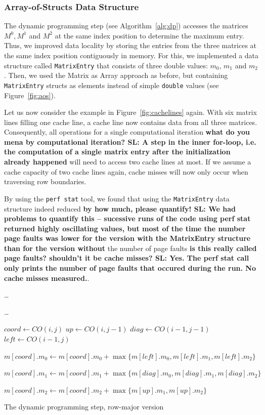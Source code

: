 \documentclass[runningheads,a4paper]{llncs}
\begin{document}
\subsubsection{Array-of-Structs Data Structure}
The dynamic programming step (see Algorithm~\ref{alg:dp}) accesses the matrices $M^0, M^1$ and $M^2$ at the same index position to determine the maximum entry. 
Thus, we improved data locality by storing the entries from the three matrices at the same index position contiguously in memory. 
For this, we implemented a data structure called \texttt{MatrixEntry} that consists of three double values: \texttt{$m_0$}, \texttt{$m_1$} and \texttt{$m_2$}. 
Then, we used the Matrix as Array approach as before, but containing \texttt{MatrixEntry} structs as elements instead of simple 
\texttt{double} values (see Figure~\ref{fig:aos}). 

Let us now consider the example in Figure~\ref{fig:cachelines} again. 
With six matrix lines filling one cache line, a cache line now contains data from all three matrices. 
Consequently, all operations for a single computational iteration {\bf what do you mena by computational iteration? SL: A step in the inner for-loop, i.e. the computation of a single matrix entry after the initialization already happened} 
will need to access two cache lines at most. 
If we assume a cache capacity of two cache lines again, cache misses will now only occur when traversing row boundaries.

By using the \texttt{perf stat} tool, we found that using the \texttt{MatrixEntry} data structure indeed reduced {\bf by how much, please quantify! SL: We had problems to quantify this -- sucessive runs of the code using perf stat returned highly oscillating values, but most of the time the number page faults was lower for the version with the MatrixEntry structure than for the version without}
the number of page faults {\bf is this really called page faults? shouldn't it be cache misses? SL: Yes. The perf stat call only prints the number of page faults that occured during the run. No cache misses measured.}.

\begin{algorithm}

\ldots{}
 {
	 {
		\ldots{}
		
		$coord \gets CO(i, j)$\;	
		$up \gets CO(i, j-1)$\;
		$diag \gets CO(i-1, j-1)$\;		
		$left \gets CO(i-1, j)$\;
		
		$m[coord].m_0 \gets m[coord].m_0 + \max\{m[left].m_0, m[left].m_1, m[left].m_2\}$\;
		
		$m[coord].m_1 \gets m[coord].m_1 + \max\{m[diag].m_0, m[diag].m_1, m[diag].m_2\}$\;
		
		$m[coord].m_2 \gets m[coord].m_2 + \max\{m[up].m_1, m[up].m_2\}$\;
	}
}

\caption{The dynamic programming step, row-major version}
\label{alg:dp}
\end{algorithm}
\end{document}
